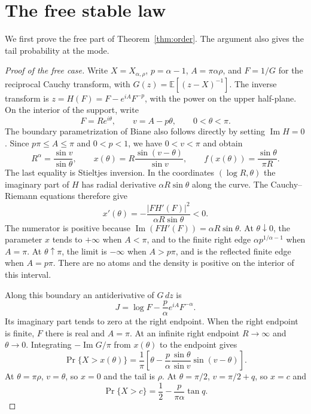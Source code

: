 \documentclass[11pt,a4paper]{article}
\numberwithin{equation}{section}
\begin{document}
\section{The free stable law}\label{sec:free}
We first prove the free part of Theorem~\ref{thm:order}. The argument
also gives the tail probability at the mode.
\begin{proof}[Proof of the free case]
Write $X=X_{\alpha,\rho}$, $p=\alpha-1$, $A=\pi\alpha\rho$, and $F=1/G$ for the reciprocal Cauchy transform, with $G(z)=\mathbb E[(z-X)^{-1}]$. The inverse transform is $z=H(F)=F-e^{iA}F^{-p}$, with the power on the upper half-plane. On the interior of the support, write
\[
 F=R e^{i\theta},\qquad v=A-p\theta,\qquad 0<\theta<\pi .
\]
The boundary parametrization of Biane \cite[Appendix~A]{BP} also follows directly by setting $\operatorname{Im} H=0$. Since $p\pi\le A\le\pi$ and $0<p<1$, we have $0<v<\pi$ and obtain
\[
 R^\alpha=\frac{\sin v}{\sin\theta},\qquad
 x(\theta)=R\frac{\sin(v-\theta)}{\sin v},\qquad
 f(x(\theta))=\frac{\sin\theta}{\pi R}.
\]
The last equality is Stieltjes inversion. In the coordinates $(\log R,\theta)$ the imaginary part of $H$ has radial derivative $\alpha R\sin\theta$ along the curve. The Cauchy--Riemann equations therefore give
\[
 x'(\theta)=-\frac{|F H'(F)|^2}{\alpha R\sin\theta}<0.
\]
The numerator is positive because $\operatorname{Im}(FH'(F))=\alpha R\sin\theta$. At $\theta\downarrow0$, the parameter $x$ tends to $+\infty$ when $A<\pi$, and to the finite right edge $\alpha p^{1/\alpha-1}$ when $A=\pi$. At $\theta\uparrow\pi$, the limit is $-\infty$ when $A>p\pi$, and is the reflected finite edge when $A=p\pi$. There are no atoms and the density is positive on the interior of this interval.

Along this boundary an antiderivative of $G\,dz$ is
\[
 J=\log F-\frac p\alpha e^{iA}F^{-\alpha}.
\]
Its imaginary part tends to zero at the right endpoint. When the right endpoint is finite, $F$ there is real and $A=\pi$. At an infinite right endpoint $R\to\infty$ and $\theta\to0$. Integrating $-\operatorname{Im}G/\pi$ from $x(\theta)$ to the endpoint gives
\begin{equation}\label{eq:free-median-tail}
 \Pr\{X>x(\theta)\}=\frac1\pi\left[
 \theta-\frac p\alpha\frac{\sin\theta}{\sin v}\sin(v-\theta)\right].
\end{equation}
At $\theta=\pi\rho$, $v=\theta$, so $x=0$ and the tail is $\rho$.
At $\theta=\pi/2$, $v=\pi/2+q$, so $x=c$ and
\[
 \Pr\{X>c\}=\frac12-\frac{p}{\pi\alpha}\tan q .
\]


\end{proof}
\end{document}
